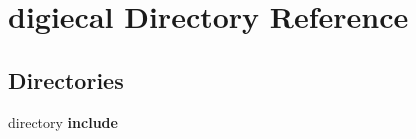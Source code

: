 \section{digiecal Directory Reference}
\label{dir_c551a052eee26ebca3fc126f64912c8d}
\subsection*{Directories}
\begin{DoxyCompactItemize}
\item 
directory {\bf include}
\end{DoxyCompactItemize}
